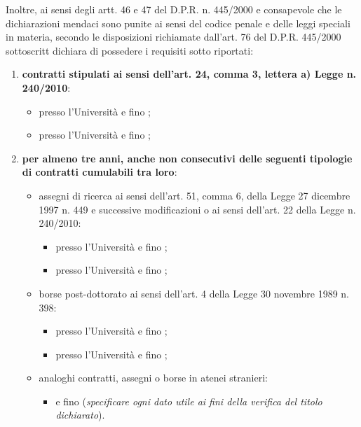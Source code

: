 Inoltre, ai sensi degli artt. 46 e 47 del D.P.R. n. 445/2000 e consapevole che 
le dichiarazioni mendaci sono punite ai sensi del codice penale e delle leggi 
speciali in materia, secondo le disposizioni richiamate dall’art. 76 del D.P.R. 
445/2000  \myTextField[.5cm]{} sottoscritt\myTextField[.5cm]{} dichiara di 
possedere i requisiti sotto riportati:
\begin{enumerate}
\item \textbf{contratti stipulati ai sensi dell'art. 24, comma 3, lettera a) 
Legge n. 240/2010}:
\begin{itemize}
 \item presso l’Università   e fino 
 ;
 \item presso l’Università   e fino 
 ;
\end{itemize}
\item \textbf{per almeno tre anni, anche non consecutivi delle seguenti tipologie 
di contratti cumulabili tra loro}:
\begin{itemize}
\item assegni di ricerca ai sensi dell’art. 51, comma 6, della Legge 27 dicembre
 1997 n. 449 e successive modificazioni o ai sensi dell’art. 22 della Legge n. 240/2010:
\begin{itemize}
 \item presso l’Università   e fino 
 ;
 \item presso l’Università   e fino 
 ;
\end{itemize}
\item borse post-dottorato ai sensi dell’art. 4 della Legge 30 novembre 1989 
n. 398:
\begin{itemize}
 \item presso l’Università   e fino 
 ;
 \item presso l’Università   e fino 
 ;
\end{itemize}
\item analoghi contratti, assegni o borse in atenei stranieri:
\begin{itemize}
\item {} e fino  (\emph{specificare ogni dato 
utile ai fini della verifica del titolo dichiarato}).

\end{itemize}
\end{itemize}
\end{enumerate}
